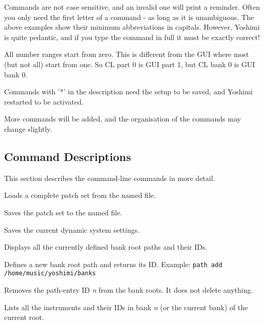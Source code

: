    Commands are not case sensitive, and an invalid one will print a reminder.
   Often you only need the first letter of a command - as long as it is
   unambiguous. The above examples show their minimum abbreviations in capitals.
   However, Yoshimi is quite pedantic, and if you type the command in full it
   must be exactly correct!

   All number ranges start from zero. This is different from the GUI where most
   (but not all) start from one. So CL part 0 is GUI part 1, but CL bank 0 is
   GUI bank 0.





   Commands with '*' in the description need the setup to be saved, and Yoshimi
   restarted to be activated. 

   More commands will be added, and the organisation of the commands
   may change slightly.

\subsection{Command Descriptions}
\label{subsec:command_line_command_descriptions}

   This section describes the command-line commands in more detail.

   \setcounter{ItemCounter}{0}      %

      Loads a complete patch set from the named file.

      Saves the patch set to the named file.

      Saves the current dynamic system settings.

      Displays all the currently defined bank root paths and their IDs.

      Defines a new bank root path and returns its ID.
      Example: \texttt{path add /home/music/yoshimi/banks}

      Removes the path-entry ID \textsl{n} from the bank roots. 
      It does not delete anything.

      Lists all the instruments and their IDs in bank \textsl{n} (or the
      current bank) of the current root.

